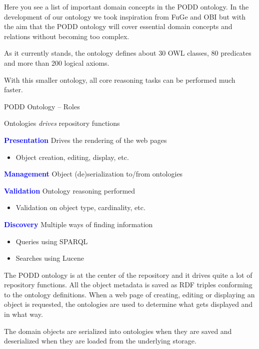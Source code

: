 \documentclass[ignorenonframetext,compress]{beamer}
\begin{document}
Here you see a list of important domain concepts in the PODD ontology.
In the development of our ontology we took inspiration from FuGe and OBI
but with the aim that the PODD ontology will cover essential domain
concepts and relations without becoming too complex.

As it currently stands, the ontology defines about 30 OWL classes, 80
predicates and more than 200 logical axioms. 

With this smaller ontology, all core reasoning tasks can be performed
much faster.

\begin{frame}{PODD Ontology -- Roles}
\begin{block}{Ontologies \emph{drives} repository functions}
\begin{list}{}{}
\item[\textcolor{blue}{\textbf{Presentation}}] Drives the rendering of the web pages
    \begin{itemize}
    \item Object creation, editing, display, etc.
    \end{itemize}
\item[\textcolor{blue}{\textbf{Management}}] Object (de)serialization to/from ontologies
\item[\textcolor{blue}{\textbf{Validation}}] Ontology reasoning performed
    \begin{itemize}
    \item Validation on object type, cardinality, etc.
    \end{itemize}
\item[\textcolor{blue}{\textbf{Discovery}}] Multiple ways of finding information
    \begin{itemize}
    \item Queries using SPARQL
    \item Searches using Lucene
    \end{itemize}
\end{list}
\end{block}
\end{frame}

The PODD ontology is at the center of the repository and it drives quite a lot
of repository functions. All the object metadata is saved as RDF triples
conforming to the ontology definitions. When a web page of creating, editing
or displaying an object is requested, the ontologies are used to determine
what gets displayed and in what way.

The domain objects are serialized into ontologies when they are saved and 
deserialized when they are loaded from the underlying storage.
\end{document}
